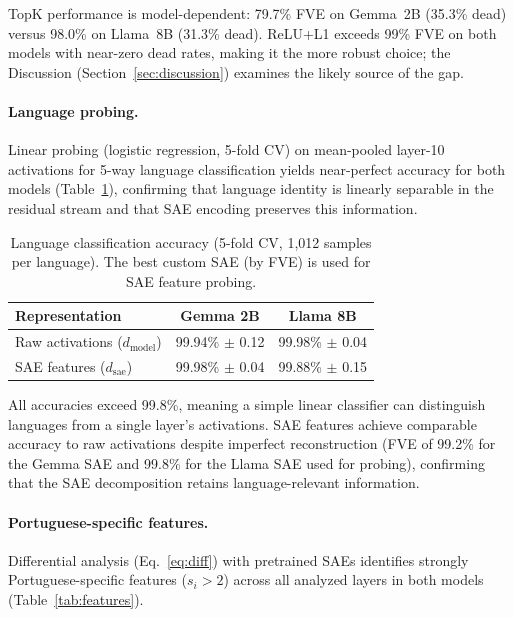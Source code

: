 \documentclass[runningheads]{llncs}
\begin{document}
TopK performance is model-dependent: 79.7\% FVE on Gemma~2B (35.3\% dead) versus 98.0\% on Llama~8B (31.3\% dead). ReLU+L1 exceeds 99\% FVE on both models with near-zero dead rates, making it the more robust choice; the Discussion (Section~\ref{sec:discussion}) examines the likely source of the gap.

\paragraph{Language probing.}
Linear probing (logistic regression, 5-fold CV) on mean-pooled layer-10 activations for 5-way language classification yields near-perfect accuracy for both models (Table~\ref{tab:probing}), confirming that language identity is linearly separable in the residual stream and that SAE encoding preserves this information.

\begin{table}[t]
\centering
\caption{Language classification accuracy (5-fold CV, 1,012 samples per language). The best custom SAE (by FVE) is used for SAE feature probing.}
\label{tab:probing}
\begin{tabular}{lcc}
\toprule
\textbf{Representation} & \textbf{Gemma 2B} & \textbf{Llama 8B} \\
\midrule
Raw activations ($d_\text{model}$) & 99.94\% $\pm$ 0.12 & 99.98\% $\pm$ 0.04 \\
SAE features ($d_\text{sae}$) & 99.98\% $\pm$ 0.04 & 99.88\% $\pm$ 0.15 \\
\bottomrule
\end{tabular}
\end{table}

All accuracies exceed 99.8\%, meaning a simple linear classifier can distinguish languages from a single layer's activations. SAE features achieve comparable accuracy to raw activations despite imperfect reconstruction (FVE of 99.2\% for the Gemma SAE and 99.8\% for the Llama SAE used for probing), confirming that the SAE decomposition retains language-relevant information.

\paragraph{Portuguese-specific features.}
\label{sec:features}

Differential analysis (Eq.~\ref{eq:diff}) with pretrained SAEs identifies strongly Portuguese-specific features ($s_i > 2$) across all analyzed layers in both models (Table~\ref{tab:features}).
\end{document}
